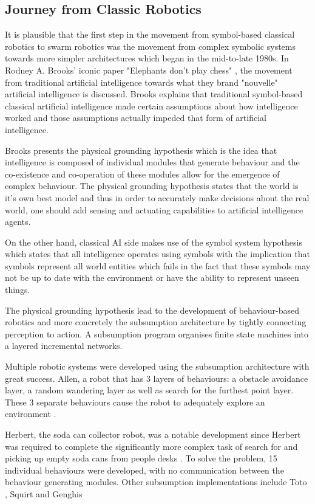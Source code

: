 \subsection{Journey from Classic Robotics}
\label{journeyfromtraditionalAI}

It is plausible that the first step in the movement from symbol-based classical robotics to swarm robotics was the movement from complex symbolic systems towards more simpler architectures which began in the mid-to-late 1980s. In Rodney A. Brooks' iconic paper "Elephants don't play chess" \cite{brooks1990elephants}, the movement from traditional artificial intelligence towards what they brand "nouvelle" artificial intelligence is discussed. Brooks explains that traditional symbol-based classical artificial intelligence made certain assumptions about how intelligence worked and those assumptions actually impeded that form of artificial intelligence. 

Brooks presents the physical grounding hypothesis which is the idea that intelligence is composed of individual modules that generate behaviour and the co-existence and co-operation of these modules allow for the emergence of complex behaviour. The physical grounding hypothesis states that the world is it's own best model and thus in order to accurately make decisions about the real world, one should add sensing and actuating capabilities to artificial intelligence agents.

On the other hand, classical AI side makes use of the symbol system hypothesis which states that all intelligence operates using symbols with the implication that symbols represent all world entities which fails in the fact that these symbols may not be up to date with the environment or have the ability to represent unseen things. 

The physical grounding hypothesis lead to the development of behaviour-based robotics and more concretely the subsumption architecture \cite{brooks1986robust} by tightly connecting perception to action. A subsumption program organises finite state machines into a layered incremental networks. 

Multiple robotic systems were developed using the subsumption architecture with great success. Allen, a robot that has 3 layers of behaviours: a obstacle avoidance layer, a random wandering layer as well as search for the furthest point layer. These 3 separate behaviours cause the robot to adequately explore an environment \cite{brooks1986robust}.

Herbert, the soda can collector robot, was a notable development since Herbert was required to complete the significantly more complex task of search for and picking up empty soda cans from people desks \cite{connell1989colony}. To solve the problem, 15 individual behaviours were developed, with no communication between the behaviour generating modules. Other subsumption implementations include Toto \cite{mataric1990distributed}, Squirt \cite{flynn1989world} and Genghis \cite{brooks1989robot}

